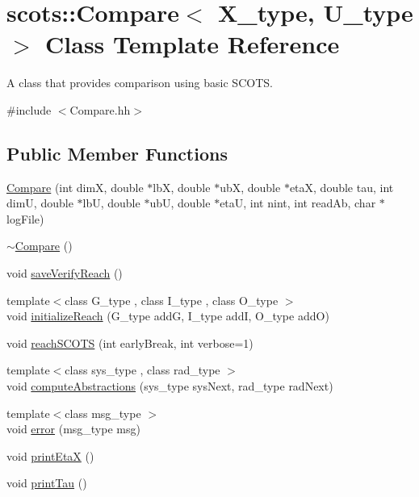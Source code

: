 \hypertarget{classscots_1_1Compare}{}\section{scots\+:\+:Compare$<$ X\+\_\+type, U\+\_\+type $>$ Class Template Reference}
\label{classscots_1_1Compare}


A class that provides comparison using basic S\+C\+O\+TS.  




{\ttfamily \#include $<$Compare.\+hh$>$}

\subsection*{Public Member Functions}
\begin{DoxyCompactItemize}
\item 
\hyperlink{classscots_1_1Compare_a06f6c44e21931f635f157d213b1834ba}{Compare} (int dimX, double $\ast$lbX, double $\ast$ubX, double $\ast$etaX, double tau, int dimU, double $\ast$lbU, double $\ast$ubU, double $\ast$etaU, int nint, int read\+Ab, char $\ast$log\+File)
\item 
\hyperlink{classscots_1_1Compare_abcd6b6626afb98b977a1c9d64ef438f2}{$\sim$\+Compare} ()
\item 
void \hyperlink{classscots_1_1Compare_aa96846be5c881576f5add5ce32f7fe8a}{save\+Verify\+Reach} ()
\item 
{\footnotesize template$<$class G\+\_\+type , class I\+\_\+type , class O\+\_\+type $>$ }\\void \hyperlink{classscots_1_1Compare_a4cb70ea51bb4778d92bd134c3b2ffc5e}{initialize\+Reach} (G\+\_\+type addG, I\+\_\+type addI, O\+\_\+type addO)
\item 
void \hyperlink{classscots_1_1Compare_a506b87a62b1adde561d725e9cc1315e9}{reach\+S\+C\+O\+TS} (int early\+Break, int verbose=1)
\item 
{\footnotesize template$<$class sys\+\_\+type , class rad\+\_\+type $>$ }\\void \hyperlink{classscots_1_1Compare_a3bdf985c18d37edf8ee63ea00f6b2635}{compute\+Abstractions} (sys\+\_\+type sys\+Next, rad\+\_\+type rad\+Next)
\item 
{\footnotesize template$<$class msg\+\_\+type $>$ }\\void \hyperlink{classscots_1_1Compare_ae694b20dbe9ceb8db5f80508e7c65488}{error} (msg\+\_\+type msg)
\item 
void \hyperlink{classscots_1_1Compare_a2c8283a2b01ed98365a74c49d0e89911}{print\+EtaX} ()
\item 
void \hyperlink{classscots_1_1Compare_a318f5349a3b0465bec67a5419d630695}{print\+Tau} ()
\end{DoxyCompactItemize}
